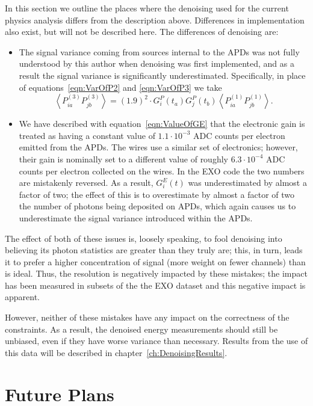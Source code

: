 In this section we outline the places where the denoising used for the current physics analysis differs from the description above.  Differences in implementation also exist, but will not be described here.  The differences of denoising are:
\begin{itemize}
\item The signal variance coming from sources internal to the APDs was not fully understood by this author when denoising was first implemented, and as a result the signal variance is significantly underestimated.  Specifically, in place of equations~\ref{eqn:VarOfP2} and \ref{eqn:VarOfP3} we take
\begin{equation}
\left< P^{(3)}_{ia} P^{(3)}_{jb} \right> = (1.9)^2 \cdot G^P_i(t_a)G^P_j(t_b) \left< P^{(1)}_{ia} P^{(1)}_{jb} \right>.
\end{equation}
\item We have described with equation~\ref{eqn:ValueOfGE} that the electronic gain is treated as having a constant value of $1.1 \cdot 10^{-3}$ ADC counts per electron emitted from the APDs.  The wires use a similar set of electronics; however, their gain is nominally set to a different value of roughly $6.3 \cdot 10^{-4}$ ADC counts per electron collected on the wires. In the EXO code the two numbers are mistakenly reversed.  As a result, $G^E_i(t)$ was underestimated by almost a factor of two; the effect of this is to overestimate by almost a factor of two the number of photons being deposited on APDs, which again causes us to underestimate the signal variance introduced within the APDs.
\end{itemize}

The effect of both of these issues is, loosely speaking, to fool denoising into believing its photon statistics are greater than they truly are; this, in turn, leads it to prefer a higher concentration of signal (more weight on fewer channels) than is ideal.  Thus, the resolution is negatively impacted by these mistakes; the impact has been measured in subsets of the the EXO dataset and this negative impact is apparent.

However, neither of these mistakes have any impact on the correctness of the constraints.  As a result, the denoised energy measurements should still be unbiased, even if they have worse variance than necessary.  Results from the use of this data will be described in chapter~\ref{ch:DenoisingResults}.

\section{Future Plans}

